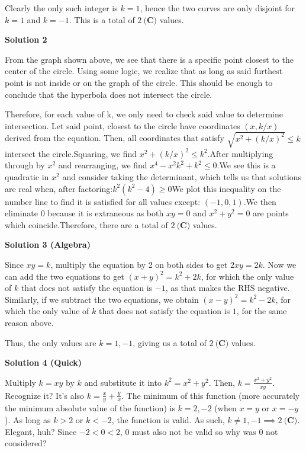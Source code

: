 \begin{enumerate}
 Clearly the only such integer is $k=1$, hence the two curves are only disjoint for $k=1$ and $k=-1$. This is a total of $\boxed{2\ \textbf{(C)}}$ values.

 



\textbf{Solution 2}

From the graph shown above, we see that there is a specific point closest to the center of the circle. Using some logic, we realize that as long as said furthest point is not inside or on the graph of the circle. This should be enough to conclude that the hyperbola does not intersect the circle. 

 Therefore, for each value of k, we only need to check said value to determine intersection. Let said point, closest to the circle have coordinates $(x, k/x)$ derived from the equation. Then, all coordinates that satisfy $\sqrt{ x^2+ (k/x)^2 } \leq k$ intersect the circle.Squaring, we find $x^2+(k/x)^2 \leq k^2.$After multiplying through by $x^2$ and rearranging, we find $x^4-x^2k^2+k^2 \leq 0$.We see this is a quadratic in $x^2$ and consider taking the determinant, which tells us that solutions are real when, after factoring:$k^2(k^2-4) \geq 0$We plot this inequality on the number line to find it is satisfied for all values except: $(-1, 0, 1)$.We then eliminate 0 because it is extraneous as both $xy=0$ and $x^2+y^2=0$ are points which coincide.Therefore, there are a total of $\boxed{2\ \textbf{(C)}}$ values.

 



\textbf{Solution 3 (Algebra)}

Since $xy=k$, multiply the equation by 2 on both sides to get $2xy=2k$. Now we can add the two equations to get $(x+y)^2=k^2+2k$, for which the only value of $k$ that does not satisfy the equation is $-1$, as that makes the RHS negative. Similarly, if we subtract the two equations, we obtain $(x-y)^2=k^2-2k$, for which the only value of $k$ that does not satisfy the equation is $1$, for the same reason above.

 Thus, the only values are $k = 1, -1$, giving us a total of $\boxed{2\ \textbf{(C)}}$ values.

 



\textbf{Solution 4 (Quick)}

Multiply $k=xy$ by $k$ and substitute it into $k^2=x^2+y^2$. Then, $k=\frac{x^2+y^2}{xy}$. Recognize it? It's also $k=\frac{x}{y}+\frac{y}{x}$. The minimum of this function (more accurately the minimum absolute value of the function) is $k=2, -2$ (when $x=y$ or $x=-y$). As long as $k>2$ or $k<-2$, the function is valid. As such, $k\neq1,-1 \implies \boxed{2\ \textbf{(C)}}$. Elegant, huh? Since $-2<0<2$, $0$ must also not be valid so why was $0$ not considered?


\end{enumerate}
